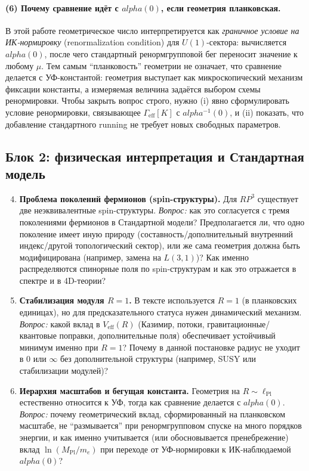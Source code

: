 \documentclass[12pt]{article}
\def\mathbb#1{#1}%
\def\alpha{alpha}%
\begin{document}
\paragraph{(6) Почему сравнение идёт с $\alpha(0)$, если геометрия планковская.}
В этой работе геометрическое число интерпретируется как \emph{граничное условие на ИК-нормировку} (renormalization condition) для $U(1)$-сектора: вычисляется $\alpha(0)$, после чего стандартный ренормгрупповой бег переносит значение к любому $\mu$.
Тем самым ``планковость'' геометрии не означает, что сравнение делается с УФ-константой: геометрия выступает как микроскопический механизм фиксации константы, а измеряемая величина задаётся выбором схемы ренормировки.
Чтобы закрыть вопрос строго, нужно (i) явно сформулировать условие ренормировки, связывающее $\Gamma_{\mathrm{eff}}[K]$ с $\alpha^{-1}(0)$, и (ii) показать, что добавление стандартного running не требует новых свободных параметров.

\subsection{Блок 2: физическая интерпретация и Стандартная модель}
\begin{enumerate}
  \setcounter{enumi}{3}
  \item \textbf{Проблема поколений фермионов (spin-структуры).}
  Для $\mathbb{RP}^3$ существует две неэквивалентные spin-структуры.
  \emph{Вопрос:} как это согласуется с тремя поколениями фермионов в Стандартной модели? Предполагается ли, что одно поколение имеет иную природу (составность/дополнительный внутренний индекс/другой топологический сектор), или же сама геометрия должна быть модифицирована (например, замена на $L(3,1)$)? Как именно распределяются спинорные поля по spin-структурам и как это отражается в спектре и в 4D-теории?

  \item \textbf{Стабилизация модуля $R=1$.}
  В тексте используется $R=1$ (в планковских единицах), но для предсказательного статуса нужен динамический механизм.
  \emph{Вопрос:} какой вклад в $V_{\mathrm{eff}}(R)$ (Казимир, потоки, гравитационные/квантовые поправки, дополнительные поля) обеспечивает устойчивый минимум именно при $R=1$? Почему в данной постановке радиус не уходит в $0$ или $\infty$ без дополнительной структуры (например, SUSY или стабилизации модулей)?

  \item \textbf{Иерархия масштабов и бегущая константа.}
  Геометрия на $R\sim \ell_{\mathrm{Pl}}$ естественно относится к УФ, тогда как сравнение делается с $\alpha(0)$.
  \emph{Вопрос:} почему геометрический вклад, сформированный на планковском масштабе, не ``размывается'' при ренормгрупповом спуске на много порядков энергии, и как именно учитывается (или обосновывается пренебрежение) вклад $\ln(M_{\mathrm{Pl}}/m_e)$ при переходе от УФ-нормировки к ИК-наблюдаемой $\alpha(0)$?
\end{enumerate}
\end{document}
